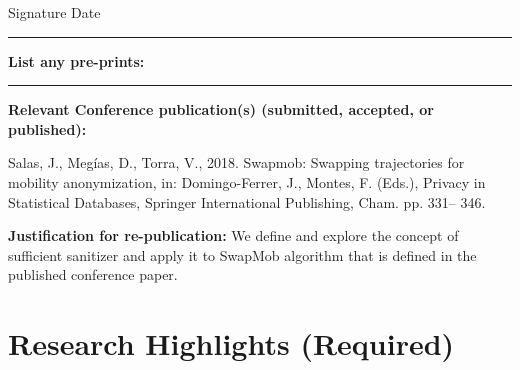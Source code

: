 \documentclass[times,twocolumn,final,authoryear]{elsarticle}
\begin{document}
\begin{table}[!th]
\begin{minipage}{.9\textwidth}
Signature\underline{\hphantom{\hspace*{7cm}}} Date\underline{\hphantom{\hspace*{4cm}}} 
\vskip1pc

\rule{\textwidth}{2pt}
\vskip1pc

{\bf List any pre-prints:}
\vskip5pc


\rule{\textwidth}{2pt}
\vskip1pc

{\bf Relevant Conference publication(s) (submitted, accepted, or
published):}
\vskip5pc

Salas, J., Meg\'ias, D., Torra, V., 2018. Swapmob: Swapping trajectories for
mobility anonymization, in: Domingo-Ferrer, J., Montes, F. (Eds.), Privacy
in Statistical Databases, Springer International Publishing, Cham. pp. 331–
346.


{\bf Justification for re-publication:}
We define and explore the concept of sufficient sanitizer and apply it to SwapMob algorithm that is defined in the published conference paper. 

\end{minipage}
\end{table}

\clearpage
\thispagestyle{empty}
\ifpreprint
  \vspace*{-1pc}
\fi

\begin{table}[!th]
\ifpreprint\else\vspace*{-5pc}\fi

\section*{Research Highlights (Required)}


\vskip1pc

\fboxsep=6pt

\end{table}
\end{document}
